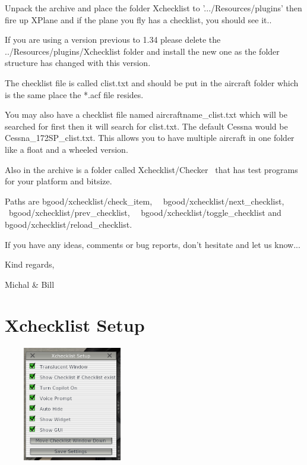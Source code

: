 \documentclass[11pt,parskip=half,a4paper]{scrartcl}
\begin{document}
Unpack the archive and place the folder Xchecklist to '.../Resources/plugins' then fire up XPlane and if the plane you fly has a checklist, you should see it.. \newline

If you are using a version previous to 1.34 please delete the ../Resources/plugins/Xchecklist folder and install the new one as the folder structure has changed with this version. \newline 

The checklist file is called clist.txt and should be put in the aircraft folder which is the same place the *.acf file resides. \newline

You may also have a checklist file named aircraftname\_clist.txt which will be searched for first then it will search for clist.txt. The default Cessna would be Cessna\_172SP\_clist.txt. This allows you to have multiple aircraft in one folder like a float and a wheeled version. \newline

Also in the archive is a folder called Xchecklist/Checker \ that has test programs for your platform and bitsize. \newline

Paths are bgood/xchecklist/check\_item, \ \ bgood/xchecklist/next\_checklist, \ bgood/xchecklist/prev\_checklist, \ \ bgood/xchecklist/toggle\_checklist and bgood/xchecklist/reload\_checklist. \newline

If you have any ideas, comments or bug reports, don't hesitate and let us know... \newline

Kind regards, \newline

Michal \& Bill \newline

\newpage
\section{Xchecklist Setup}

\begin{center}
\includegraphics[width=6cm, height=5cm]{XchecklistSetup.png}
\end{center}
\end{document}
